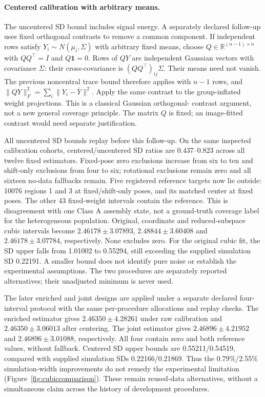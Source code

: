 \paragraph{Centered calibration with arbitrary means.}
The uncentered SD bound includes signal energy. A separately declared follow-up
uses fixed orthogonal contrasts to remove a common component. If independent
rows satisfy $Y_i\sim N(\mu_i,\Sigma)$ with arbitrary fixed means, choose
$Q\in\mathbb R^{(n-1)\times n}$ with $QQ^\top=I$ and $Q\mathbf1=0$.
Rows of $QY$ are independent Gaussian vectors with covariance $\Sigma$:
their cross-covariance is $(QQ^\top)_{ij}\Sigma$. Their means need not vanish.
The previous noncentral trace bound therefore applies with $n-1$ rows, and
$\|QY\|_F^2=\sum_i\|Y_i-\bar Y\|^2$. Apply the same contrast to the
group-inflated weight projections. This is a classical Gaussian orthogonal-
contrast argument, not a new general coverage principle. The matrix $Q$ is
fixed; an image-fitted contrast would need separate justification.

All uncentered SD bounds replay before this follow-up. On the same inspected
calibration cohorts, centered/uncentered SD ratios are 0.437--0.823 across all
twelve fixed estimators. Fixed-pose zero exclusions increase from six to ten
and shift-only exclusions from four to six; rotational exclusions remain zero
and all sixteen no-data fallbacks remain. Five registered reference targets
now lie outside: 10076 regions 1 and 3 at fixed/shift-only poses, and its
matched center at fixed poses. The other 43 fixed-weight intervals contain
the reference. This is disagreement with one Class A assembly state, not
a ground-truth coverage label for the heterogeneous population. Original, coordinate and reduced-subspace cubic intervals
become $2.46178\pm3.07893$, $2.48844\pm3.60408$ and $2.46178\pm3.07784$,
respectively. None excludes zero. For the original cubic fit, the SD upper
falls from 1.01002 to 0.55294, still exceeding the supplied simulation SD
0.22191. A smaller bound does not identify pure noise or establish the
experimental assumptions. The two procedures are separately reported
alternatives; their unadjusted minimum is never used.

The later enriched and joint designs are applied under a separate declared
four-interval protocol with the same per-procedure allocations and replay
checks. The enriched estimator gives $2.46350\pm4.28261$ under raw calibration
and $2.46350\pm3.06013$ after centering. The joint estimator gives
$2.46896\pm4.21952$ and $2.46896\pm3.01088$, respectively. All four contain
zero and both reference values, without fallback. Centered SD upper bounds
are 0.55211/0.54519, compared with supplied simulation SDs 0.22166/0.21869.
Thus the 0.79\%/2.55\% simulation-width improvements do not remedy the
experimental limitation (Figure~\ref{fig:cubiccomparison}). These remain
reused-data alternatives, without a simultaneous claim across the history
of development procedures.



